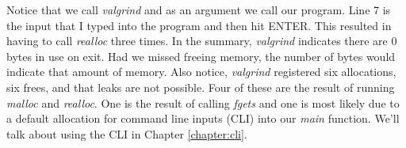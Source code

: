 \documentclass[../main.tex]{subfiles}
\begin{document}
	Notice that we call \textit{valgrind} and as an argument we call our program.  Line 7 is the input that I typed into the program and then hit ENTER.  This resulted in having to call \textit{realloc} three times.  In the summary, \textit{valgrind} indicates there are 0 bytes in use on exit.  Had we missed freeing memory, the number of bytes would indicate that amount of memory.  Also notice, \textit{valgrind} registered six allocations, six frees, and that leaks are not possible.  Four of these are the result of running \textit{malloc} and \textit{realloc}.  One is the result of calling \textit{fgets} and one is most likely due to a default allocation for command line inputs (CLI) into our \textit{main} function.  We'll talk about using the CLI in Chapter \ref{chapter:cli}.
	
\end{document}
